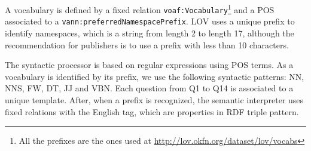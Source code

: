 \documentclass[runningheads,a4paper]{llncs}
\begin{document}
A vocabulary is defined by a fixed relation \texttt{voaf:Vocabulary}\footnote{All the prefixes are the ones used at \url{http://lov.okfn.org/dataset/lov/vocabs}} and a POS associated to a \texttt{vann:preferredNamespacePrefix}. LOV uses a unique prefix to identify namespaces, which is a string from length 2 to length 17, although the recommendation for publishers is to use a prefix with less than 10 characters.

The syntactic processor is based on regular expressions using POS terms. As a vocabulary is identified by its prefix, we use  the following syntactic patterns: NN, NNS, FW, DT, JJ and VBN. Each question from Q1 to Q14 is associated to a unique template. After, when a prefix is recognized, the semantic interpreter uses fixed relations with the English tag, which are properties in RDF triple pattern. 

\end{document}
